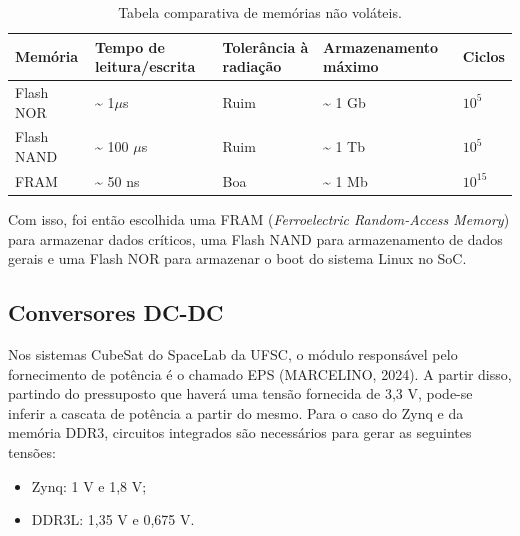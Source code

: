 \begin{table}[H]
	\ABNTEXfontereduzida
	\caption{\label{tab:memnvol}Tabela comparativa de memórias não voláteis.}
    \centering
    \begin{tabular}{@{} >{\centering}p{2cm} >{\centering}p{3cm} >{\centering}p{3cm} >{\centering}p{3cm}>{\centering}p{3cm} @{}}
    
		\toprule
		\textbf{Memória} & \textbf{Tempo de leitura/escrita} & \textbf{Tolerância à radiação} & \textbf{Armazenamento máximo} & \textbf{Ciclos} \tabularnewline 
        \midrule
        Flash NOR & \textasciitilde{} 1$\mu$s & Ruim & \textasciitilde{} 1 Gb & \textbf{$10^5$} \tabularnewline
        
        \midrule
        Flash NAND & \textasciitilde{} 100 $\mu$s & Ruim &\textasciitilde{} 1 Tb & \textbf{$10^5$} \tabularnewline 

        \midrule
        FRAM & \textasciitilde{} 50 ns & Boa & \textasciitilde{} 1 Mb & \textbf{$10^{15}$}  \tabularnewline 
        
        \bottomrule
	\end{tabular}
\end{table}

Com isso, foi então escolhida uma FRAM (\textit{Ferroelectric Random-Access Memory}) para armazenar dados críticos, uma Flash NAND para armazenamento de dados gerais e uma Flash NOR para armazenar o boot do sistema Linux no SoC.

\subsection{Conversores DC-DC}
Nos sistemas CubeSat do SpaceLab da UFSC, o módulo responsável pelo fornecimento de potência é o chamado EPS (MARCELINO, 2024). A partir disso, partindo do pressuposto que haverá uma tensão fornecida de 3,3 V, pode-se inferir a cascata de potência a partir do mesmo. Para o caso do Zynq e da memória DDR3, circuitos integrados são necessários para gerar as seguintes tensões: 

\begin{itemize}
	\item Zynq: 1 V e 1,8 V; 
	\item DDR3L: 1,35 V e 0,675 V.
\end{itemize}

